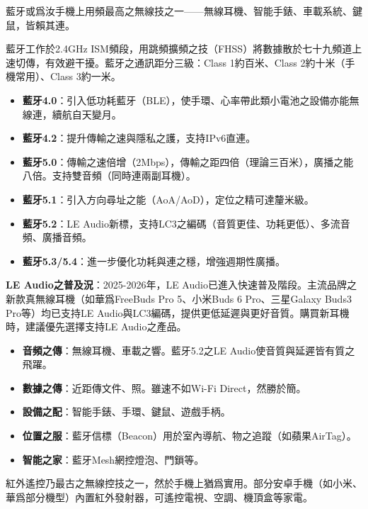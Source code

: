 藍牙或爲汝手機上用頻最高之無線技之一——無線耳機、智能手錶、車載系統、鍵鼠，皆賴其連。


藍牙工作於2.4GHz ISM頻段，用跳頻擴頻之技（FHSS）將數據散於七十九頻道上速切傳，有效避干擾。藍牙之通訊距分三級：Class 1約百米、Class 2約十米（手機常用）、Class 3約一米。


\begin{itemize}
  \item \textbf{藍牙4.0}：引入低功耗藍牙（BLE），使手環、心率帶此類小電池之設備亦能無線連，續航自天變月。
  \item \textbf{藍牙4.2}：提升傳輸之速與隱私之護，支持IPv6直連。
  \item \textbf{藍牙5.0}：傳輸之速倍增（2Mbps），傳輸之距四倍（理論三百米），廣播之能八倍。支持雙音頻（同時連兩副耳機）。
  \item \textbf{藍牙5.1}：引入方向尋址之能（AoA/AoD），定位之精可達釐米級。
  \item \textbf{藍牙5.2}：LE Audio新標，支持LC3之編碼（音質更佳、功耗更低）、多流音頻、廣播音頻。
  \item \textbf{藍牙5.3/5.4}：進一步優化功耗與連之穩，增強週期性廣播。
\end{itemize}

\textbf{LE Audio之普及況}：2025-2026年，LE Audio已進入快速普及階段。主流品牌之新款真無線耳機（如華爲FreeBuds Pro 5、小米Buds 6 Pro、三星Galaxy Buds3 Pro等）均已支持LE Audio與LC3編碼，提供更低延遲與更好音質。購買新耳機時，建議優先選擇支持LE Audio之產品。


\begin{itemize}
  \item \textbf{音頻之傳}：無線耳機、車載之響。藍牙5.2之LE Audio使音質與延遲皆有質之飛躍。
  \item \textbf{數據之傳}：近距傳文件、照。雖速不如Wi-Fi Direct，然勝於簡。
  \item \textbf{設備之配}：智能手錶、手環、鍵鼠、遊戲手柄。
  \item \textbf{位置之服}：藍牙信標（Beacon）用於室內導航、物之追蹤（如蘋果AirTag）。
  \item \textbf{智能之家}：藍牙Mesh網控燈泡、門鎖等。
\end{itemize}


紅外遙控乃最古之無線控技之一，然於手機上猶爲實用。部分安卓手機（如小米、華爲部分機型）內置紅外發射器，可遙控電視、空調、機頂盒等家電。


